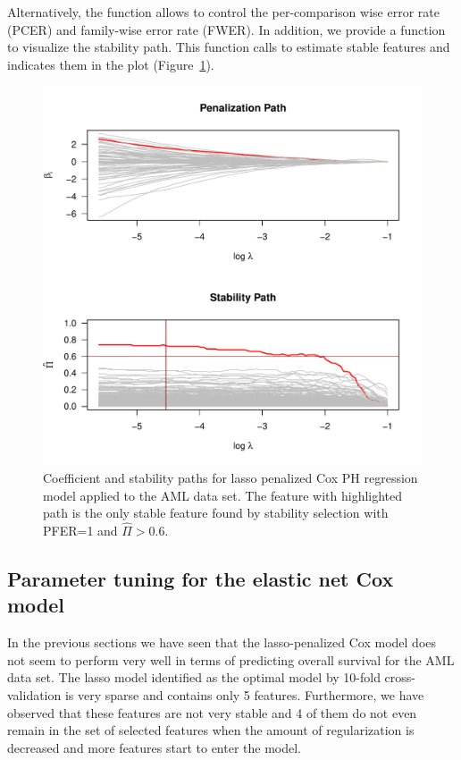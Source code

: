 \documentclass[]{jss}
\begin{document}
Alternatively, the  function allows to control the per-comparison wise error rate (PCER) and family-wise error rate (FWER). In addition, we provide a  function to visualize the stability path. This function calls  to estimate stable features and indicates them in the plot (Figure~\ref{stab:path}).

\begin{figure}[t!]
\begin{center}
\includegraphics{c060_vignette-stabilitySelection3}
\end{center}
\caption{Coefficient and stability paths for lasso penalized Cox PH regression model applied to the AML data set. The feature with highlighted path is the only stable feature found by stability selection with PFER=1 and $\hat\Pi >0.6$.}
\label{stab:path}
\end{figure}

\subsection{Parameter tuning for the elastic net Cox model}

In the previous sections we have seen that the lasso-penalized Cox model does not seem to perform very well in terms of predicting overall survival for the AML data set. 
The lasso model identified as the optimal model by 10-fold cross-validation is very sparse and contains only 5 features.
Furthermore, we have observed that these features are not very stable and 4 of them do not even remain in the set of selected features when the amount of regularization is decreased and more features start to enter the model.
\end{document}
